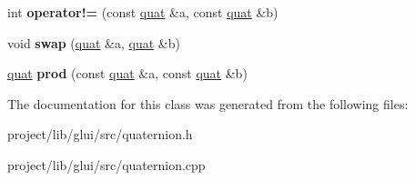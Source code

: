 \begin{DoxyCompactItemize}
\item 
\hypertarget{classquat_a76b6b58902bf431c7c193e1720b0b182}{int {\bfseries operator!=} (const \hyperlink{classquat}{quat} \&a, const \hyperlink{classquat}{quat} \&b)}\label{classquat_a76b6b58902bf431c7c193e1720b0b182}

\item 
\hypertarget{classquat_a465e9ab76658bed899ad8095a17647c0}{void {\bfseries swap} (\hyperlink{classquat}{quat} \&a, \hyperlink{classquat}{quat} \&b)}\label{classquat_a465e9ab76658bed899ad8095a17647c0}

\item 
\hypertarget{classquat_a788864b84ce05a4c86cbd7edcd5adb24}{\hyperlink{classquat}{quat} {\bfseries prod} (const \hyperlink{classquat}{quat} \&a, const \hyperlink{classquat}{quat} \&b)}\label{classquat_a788864b84ce05a4c86cbd7edcd5adb24}

\end{DoxyCompactItemize}


The documentation for this class was generated from the following files\-:\begin{DoxyCompactItemize}
\item 
project/lib/glui/src/quaternion.\-h\item 
project/lib/glui/src/quaternion.\-cpp\end{DoxyCompactItemize}
